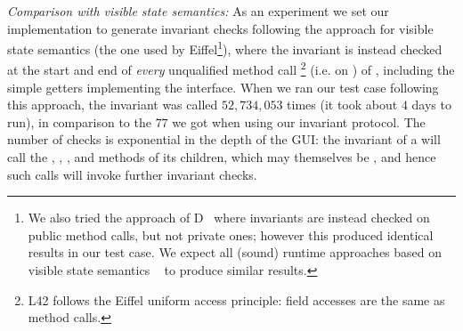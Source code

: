 \textit{Comparison with visible state semantics:}
As an experiment we set our implementation to generate invariant checks following the approach for visible state semantics (the one used by Eiffel\footnote{We also tried the approach of D~\cite{Alexandrescu:2010:DPL:1875434,DRef} where invariants are instead checked on public method calls, but not private ones; however this produced identical results in our test case.
We expect all (sound) runtime approaches based on visible state semantics ~\cite{feldman2006jose,fahndrich2010embedded,abercrombie2002jcontractor,tran2003design}
to produce similar results.
}), where the invariant is instead checked at the start and end of \emph{every} unqualified method call%
\footnote{L42 follows the Eiffel uniform access principle: field accesses are the same as method calls.}
(i.e. on \Q@this@)
of \Q@SafeMovable@, including the simple getters implementing the \Q@Widget@ interface. When we ran our test case following this approach, the invariant was called $52,734,053$ times (it took about $4$ days to run), in comparison to the $77$ we got when using our invariant protocol. The number of checks is exponential in the depth of the GUI: the invariant of a \Q@SafeMovable@ will call the \Q@width@, \Q@height@, \Q@left@, and \Q@top@ methods of its children, which may themselves be \Q@SafeMovable@s, and hence such calls will invoke further invariant checks. %



